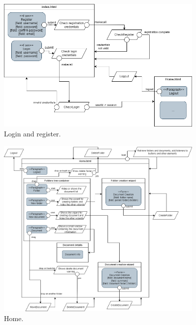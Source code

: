 \documentclass[a4paper,12pt]{article}
\begin{document}
\begin{figure}[H]
    \centering
    \includegraphics[width=0.9\textwidth]{JS/JSLoginSequence.png}
    \caption{Login and register.}
\end{figure}
\begin{figure}[H]
    \centering
    \includegraphics[width=0.9\textwidth]{JS/JSHomeSequence.png}
    \caption{Home.}
\end{figure}

\newpage
\end{document}
